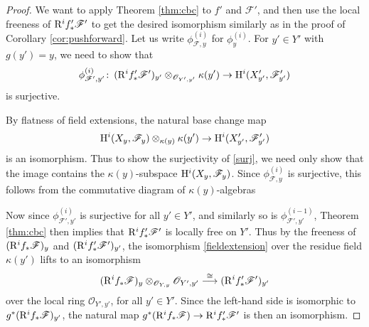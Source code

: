 \documentclass{gtpart}
\theoremstyle{definition}
\theoremstyle{remark}
\def\co{\colon\thinspace}
\newcommand{\CO}{{\mathscr{O}}}
\newcommand{\CF}{{\mathscr{F}}}
\newcommand{\rt}{{\rm R}}
\newcommand{\ho}{{\rm H}}
\newcommand{\rf}{\kappa}
\newcommand{\f}{\phi}
\begin{document}
\begin{proof}
 We want to apply Theorem \ref{thm:cbc} to $f'$ and $\CF'$, 
 and then use the local freeness of $\rt^i f'_* \CF'$ to get the desired isomorphism similarly as in the proof of Corollary \ref{cor:pushforward}.  
 Let us write $\f_{\CF,y}^{(i)}$ for $\f_y^{(i)}$.  
 For $y' \in Y'$ with $g(y') = y$, we need to show that 
 \begin{equation}
 \label{surj}
  \f_{\CF',y'}^{(i)} \co (\rt^i f'_* \CF')_{y'} \otimes_{\CO_{Y',y'}} \rf(y') \to \ho^i(X'_{y'},\CF'_{y'}) 
 \end{equation}
 is surjective.  

 By flatness of field extensions, the natural base change map 
 \begin{equation}
 \label{fieldextension}
  \ho^i(X_y,\CF_y) \otimes_{\rf(y)} \rf(y') \to \ho^i(X'_{y'},\CF'_{y'}) 
 \end{equation}
 is an isomorphism.  
 Thus to show the surjectivity of \eqref{surj}, we need only show that the image contains the $\rf(y)$-subspace $\ho^i(X_y,\CF_y)$.  
 Since $\f_{\CF,y}^{(i)}$ is surjective, this follows from the commutative diagram of $\rf(y)$-algebras 
 \begin{center}
 \end{center}

 Now since $\f_{\CF',y'}^{(i)}$ is surjective for all $y' \in Y'$, and similarly so is $\f_{\CF',y'}^{(i-1)}$, 
 Theorem \ref{thm:cbc} then implies that $\rt^i f'_* \CF'$ is locally free on $Y'$.  
 Thus by the freeness of $(\rt^i f_* \CF)_y$ and $(\rt^i f'_* \CF')_{y'}$, the isomorphism \eqref{fieldextension} over the residue field $\rf(y')$ lifts to an isomorphism 
 \[
  (\rt^i f_* \CF)_y \otimes_{\CO_{Y,y}} \CO_{Y',y'} \stackrel{\cong}{\longrightarrow} (\rt^i f'_* \CF')_{y'} 
 \]
 over the local ring $\CO_{Y',y'}$, for all $y' \in Y'$.  
 Since the left-hand side is isomorphic to $g^*(\rt^i f_* \CF)_{y'}$, the natural map $g^*(\rt^i f_* \CF) \to \rt^i f'_* \CF'$ is then an isomorphism.  
\end{proof}
\end{document}

